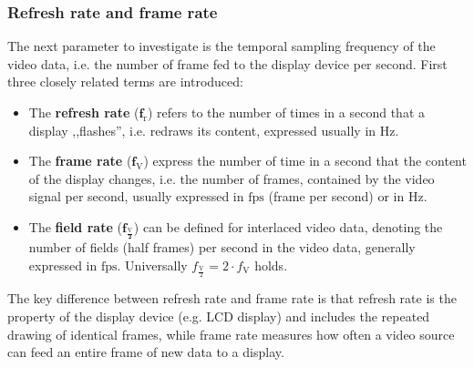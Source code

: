 
\subsubsection*{Refresh rate and frame rate}

The next parameter to investigate is the temporal sampling frequency of the video data, i.e. the number of frame fed to the display device per second.
First three closely related terms are introduced:
\begin{itemize}
\item The \textbf{refresh rate} ($\mathbf{f_{\mathrm{r}}}$) refers to the number of times in a second that a display ,,flashes'', i.e. redraws its content, expressed usually in $\mathrm{Hz}$.
\item The \textbf{frame rate} ($\mathbf{f_{\mathrm{V}}}$) express the number of time in a second that the content of the display changes, i.e. the number of frames, contained by the video signal per second, usually expressed in $\mathrm{fps}$ (frame per second) or in $\mathrm{Hz}$.
\item The \textbf{field rate} ($\mathbf{f_{\frac{\mathrm{V}}{2}}}$) can be defined for interlaced video data, denoting the number of fields (half frames) per second in the video data, generally expressed in $\mathrm{fps}$.
Universally $f_{\frac{\mathrm{V}}{2}} = 2\cdot f_{\mathrm{V}}$ holds.
\end{itemize}
The key difference between refresh rate and frame rate is that refresh rate is the property of the display device (e.g. LCD display) and includes the repeated drawing of identical frames, while frame rate measures how often a video source can feed an entire frame of new data to a display.

